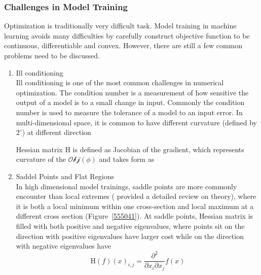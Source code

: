 \subsubsection{Challenges in Model Training}

Optimization is traditionally very difficult task. Model training in machine learning avoids many difficulties by carefully construct objective function to be continuous, differentiable and convex. However, there are still a few common problems need to be discussed. 

\begin{enumerate}
    \item Ill conditioning\\
Ill conditioning is one of the most common challenges in numerical optimization. The condition number is a measurement of how sensitive the output of a model is to a small change in input. Commonly the condition number is used to measure the tolerance of a model to an input error.  In multi-dimensional space, it is common to have different curvature (defined by $2^\circ$) at different direction

Hessian matrix $\mathrm{H}$ is defined as Jacobian of the gradient, which represents curvature of the $\mathcal{Obj}(\phi)$ and takes form as 
    \item Saddel Points and Flat Regions\\
In high dimensional model trainings, saddle points are more commonly encounter than local extremes (\citet{DauphinPGCGB14} provided a detailed review on theory), where it is both a local minimum within one cross-section and local maximum at a different cross section (Figure~\ref{555041}). At saddle points, Hessian matrix is filled with both positive and negative eigenvalues, where points sit on the direction with positive eigenvalues have larger cost while on the direction with negative eigenvalues have 
\begin{equation}
    \mathrm{H}(f)(x)_{i,j} = \frac{\partial^2}{\partial x_i \partial x_j}f(x)
\end{equation}
\end{enumerate}

